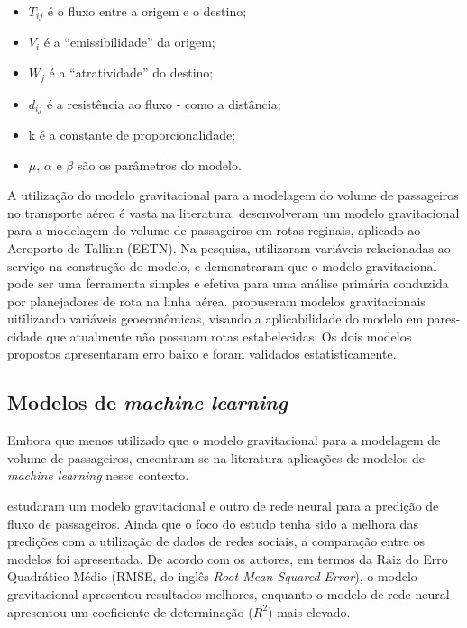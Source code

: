 \documentclass[12pt]{article}
\providecommand{\tightlist}{%
  \setlength{\itemsep}{0pt}\setlength{\parskip}{0pt}}
\begin{document}
\begin{itemize}
\tightlist
\item
  \(T_{ij}\) é o fluxo entre a origem e o destino;
\item
  \(V_i\) é a \enquote{emissibilidade} da origem;
\item
  \(W_j\) é a \enquote{atratividade} do destino;
\item
  \(d_{ij}\) é a resistência ao fluxo - como a distância;
\item
  k é a constante de proporcionalidade;
\item
  \(\mu\), \(\alpha\) e \(\beta\) são os parâmetros do modelo.
\end{itemize}

A utilização do modelo gravitacional para a modelagem do volume de
passageiros no transporte aéreo é vasta na literatura.
\citet{Nommik2016} desenvolveram um modelo gravitacional para a
modelagem do volume de passageiros em rotas reginais, aplicado ao
Aeroporto de Tallinn (EETN). Na pesquisa, utilizaram variáveis
relacionadas ao serviço na construção do modelo, e demonstraram que o
modelo gravitacional pode ser uma ferramenta simples e efetiva para uma
análise primária conduzida por planejadores de rota na linha aérea.
\citet{Grosche2007} propuseram modelos gravitacionais uitilizando
variáveis geoeconômicas, visando a aplicabilidade do modelo em
pares-cidade que atualmente não possuam rotas estabelecidas. Os dois
modelos propostos apresentaram erro baixo e foram validados
estatisticamente.

\hypertarget{modelos-de-machine-learning}{%
\subsection{\texorpdfstring{Modelos de \emph{machine
learning}}{Modelos de machine learning}}\label{modelos-de-machine-learning}}

Embora que menos utilizado que o modelo gravitacional para a modelagem
de volume de passageiros, encontram-se na literatura aplicações de
modelos de \emph{machine learning} nesse contexto.

\citet{pourebrahim2018} estudaram um modelo gravitacional e outro de
rede neural para a predição de fluxo de passageiros. Ainda que o foco do
estudo tenha sido a melhora das predições com a utilização de dados de
redes sociais, a comparação entre os modelos foi apresentada. De acordo
com os autores, em termos da Raiz do Erro Quadrático Médio (RMSE, do
inglês \emph{Root Mean Squared Error}), o modelo gravitacional
apresentou resultados melhores, enquanto o modelo de rede neural
apresentou um coeficiente de determinação (\(R^2\)) mais elevado.
\end{document}
